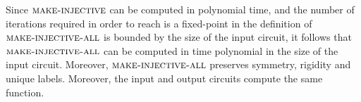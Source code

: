 \documentclass[../paper.tex]{subfiles}
\begin{document}
Since ${\normalfont\textsc{make-injective}}$ can be computed in polynomial time, and the number
of iterations required in order to reach is a fixed-point in the definition of
${\normalfont\textsc{make-injective-all}}$ is bounded by the size of the input circuit, it
follows that ${\normalfont\textsc{make-injective-all}}$ can be computed in time polynomial in the
size of the input circuit. Moreover, ${\normalfont\textsc{make-injective-all}}$ preserves
symmetry, rigidity and unique labels. Moreover, the input and output circuits
compute the same function.


  





\end{document}
